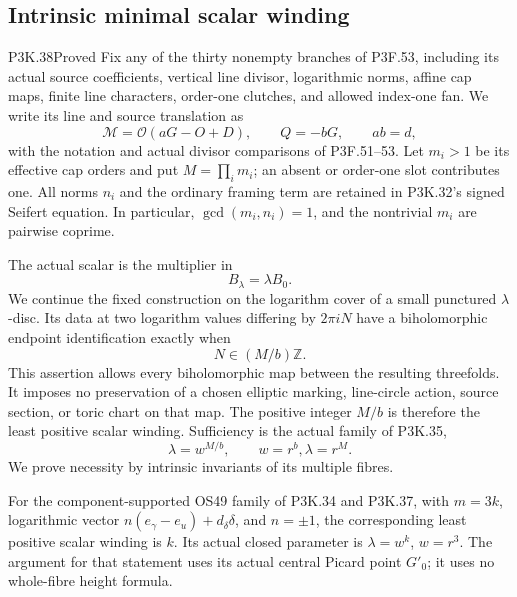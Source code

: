 \subsection{Intrinsic minimal scalar winding}
\begin{statement}{P3K.38}{Proved}
Fix any of the thirty nonempty branches of P3F.53, including its actual
source coefficients, vertical line divisor, logarithmic norms, affine
cap maps, finite line characters, order-one clutches, and allowed
index-one fan. We write its line and source translation as
\[
 \mathcal M=\mathcal O(aG-O+D),\qquad Q=-bG,
 \qquad ab=d,
\]
with the notation and actual divisor comparisons of P3F.51--53. Let
\(m_i>1\) be its effective cap orders and put
\(M=\prod_i m_i\); an absent or order-one slot contributes one.
All norms \(n_i\) and the ordinary framing term are retained in
P3K.32's signed Seifert equation. In particular,
\(\gcd(m_i,n_i)=1\), and the nontrivial \(m_i\) are pairwise
coprime.

The actual scalar is the multiplier in
\[
                         B_\lambda=\lambda B_0.       \tag{IM.1}
\]
We continue the fixed construction on the logarithm cover of a small
punctured \(\lambda\)-disc. Its data at two logarithm values differing
by \(2\pi iN\) have a biholomorphic endpoint identification exactly
when
\[
                              N\in (M/b)\mathbb Z.     \tag{IM.2}
\]
This assertion allows every biholomorphic map between the resulting
threefolds. It imposes no preservation of a chosen elliptic marking,
line-circle action, source section, or toric chart on that map.
The positive integer \(M/b\) is therefore the least positive scalar
winding. Sufficiency is the actual family of P3K.35,
\[
                     \lambda=w^{M/b},\qquad w=r^b,
                     \lambda=r^M.                     \tag{IM.3}
\]
We prove necessity by intrinsic invariants of its multiple fibres.

For the component-supported OS49 family of P3K.34 and P3K.37, with
\(m=3k\), logarithmic vector
\(n(e_\gamma-e_u)+d_\delta\delta\), and \(n=\pm1\), the
corresponding least positive scalar winding is \(k\). Its actual
closed parameter is \(\lambda=w^k\), \(w=r^3\).
The argument for that statement uses its actual central Picard point
\(G'_0\); it uses no whole-fibre height formula.
\end{statement}
